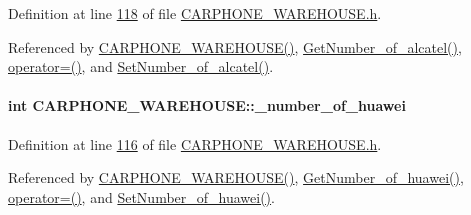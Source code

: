 Definition at line \hyperlink{_c_a_r_p_h_o_n_e___w_a_r_e_h_o_u_s_e_8h_source_l00118}{118} of file \hyperlink{_c_a_r_p_h_o_n_e___w_a_r_e_h_o_u_s_e_8h_source}{C\+A\+R\+P\+H\+O\+N\+E\+\_\+\+W\+A\+R\+E\+H\+O\+U\+S\+E.\+h}.



Referenced by \hyperlink{_c_a_r_p_h_o_n_e___w_a_r_e_h_o_u_s_e_8h_source_l00024}{C\+A\+R\+P\+H\+O\+N\+E\+\_\+\+W\+A\+R\+E\+H\+O\+U\+S\+E()}, \hyperlink{_c_a_r_p_h_o_n_e___w_a_r_e_h_o_u_s_e_8cpp_source_l00071}{Get\+Number\+\_\+of\+\_\+alcatel()}, \hyperlink{_c_a_r_p_h_o_n_e___w_a_r_e_h_o_u_s_e_8h_source_l00075}{operator=()}, and \hyperlink{_c_a_r_p_h_o_n_e___w_a_r_e_h_o_u_s_e_8cpp_source_l00067}{Set\+Number\+\_\+of\+\_\+alcatel()}.

\paragraph[{\texorpdfstring{\+\_\+number\+\_\+of\+\_\+huawei}{_number_of_huawei}}]{\setlength{\rightskip}{0pt plus 5cm}int C\+A\+R\+P\+H\+O\+N\+E\+\_\+\+W\+A\+R\+E\+H\+O\+U\+S\+E\+::\+\_\+number\+\_\+of\+\_\+huawei\hspace{0.3cm}{\ttfamily [private]}}\hypertarget{class_c_a_r_p_h_o_n_e___w_a_r_e_h_o_u_s_e_a4bf36b969e0873142ecac780d6f240bf_a4bf36b969e0873142ecac780d6f240bf}{}\label{class_c_a_r_p_h_o_n_e___w_a_r_e_h_o_u_s_e_a4bf36b969e0873142ecac780d6f240bf_a4bf36b969e0873142ecac780d6f240bf}


Definition at line \hyperlink{_c_a_r_p_h_o_n_e___w_a_r_e_h_o_u_s_e_8h_source_l00116}{116} of file \hyperlink{_c_a_r_p_h_o_n_e___w_a_r_e_h_o_u_s_e_8h_source}{C\+A\+R\+P\+H\+O\+N\+E\+\_\+\+W\+A\+R\+E\+H\+O\+U\+S\+E.\+h}.



Referenced by \hyperlink{_c_a_r_p_h_o_n_e___w_a_r_e_h_o_u_s_e_8h_source_l00024}{C\+A\+R\+P\+H\+O\+N\+E\+\_\+\+W\+A\+R\+E\+H\+O\+U\+S\+E()}, \hyperlink{_c_a_r_p_h_o_n_e___w_a_r_e_h_o_u_s_e_8cpp_source_l00087}{Get\+Number\+\_\+of\+\_\+huawei()}, \hyperlink{_c_a_r_p_h_o_n_e___w_a_r_e_h_o_u_s_e_8h_source_l00075}{operator=()}, and \hyperlink{_c_a_r_p_h_o_n_e___w_a_r_e_h_o_u_s_e_8cpp_source_l00083}{Set\+Number\+\_\+of\+\_\+huawei()}.

